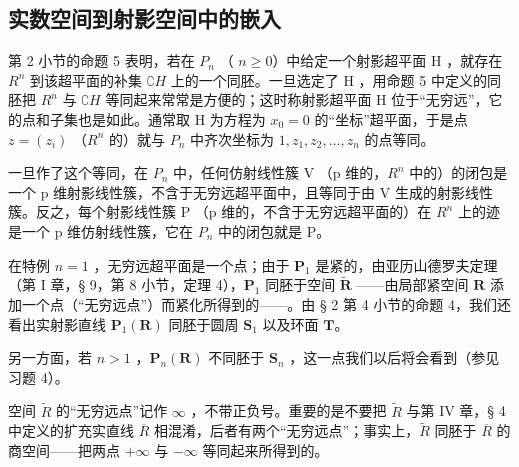 \subsection{实数空间到射影空间中的嵌入}

第 2 小节的命题 5 表明，若在 \(P_{n}\) （ \(n \geqslant 0\)）中给定一个射影超平面 H ，就存在 \(R^{n}\) 到该超平面的补集 \(\complement H\) 上的一个同胚。一旦选定了 H ，用命题 5 中定义的同胚把 \(R^{n}\) 与 \(\complement H\) 等同起来常常是方便的；这时称射影超平面 H 位于“无穷远”，它的点和子集也是如此。通常取 H 为方程为 \(x_{0}=0\) 的“坐标”超平面，于是点 \(z=(z_{i})\) （\(R^{n}\) 的）就与 \(P_{n}\) 中齐次坐标为 \(1, z_{1}, z_{2}, \ldots, z_{n}\) 的点等同。

一旦作了这个等同，在 \(P_{n}\) 中，任何仿射线性簇 V （p 维的，\(R^{n}\) 中的）的闭包是一个 p 维射影线性簇，不含于无穷远超平面中，且等同于由 V 生成的射影线性簇。反之，每个射影线性簇 P （p 维的，不含于无穷远超平面的）在 \(R^{n}\) 上的迹是一个 p 维仿射线性簇，它在 \(P_{n}\) 中的闭包就是 P。

在特例 \(n = 1\) ，无穷远超平面是一个点；由于 \(\mathbf{P}_1\) 是紧的，由亚历山德罗夫定理（第 I 章，§ 9，第 8 小节，定理 4），\(\mathbf{P}_1\) 同胚于空间 \(\tilde{\mathbf{R}}\) ——由局部紧空间 \(\mathbf{R}\) 添加一个点（“无穷远点”）而紧化所得到的——。由 § 2 第 4 小节的命题 4，我们还看出实射影直线 \(\mathbf{P}_1(\mathbf{R})\) 同胚于圆周 \(\mathbf{S}_1\) 以及环面 \(\mathbf{T}\)。

另一方面，若 \(n > 1\) ，\(\mathbf{P}_n(\mathbf{R})\) 不同胚于 \(\mathbf{S}_n\) ，这一点我们以后将会看到（参见习题 4）。

空间 \(\tilde{R}\) 的“无穷远点”记作 \(\infty\) ，不带正负号。重要的是不要把 \(\tilde{R}\) 与第 IV 章，§ 4 中定义的扩充实直线 \(\overline{R}\) 相混淆，后者有两个“无穷远点”；事实上，\(\tilde{R}\) 同胚于 \(\overline{R}\) 的商空间——把两点 \(+\infty\) 与 \(-\infty\) 等同起来所得到的。

